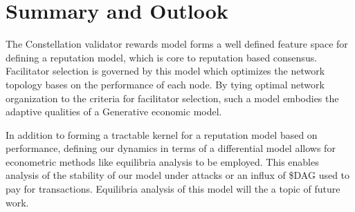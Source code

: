 \documentclass{article}
\begin{document}
\section{Summary and Outlook}
The Constellation validator rewards model forms a well defined feature space for defining a reputation model, which is core to reputation based consensus. Facilitator selection is governed by this model which optimizes the network topology bases on the performance of each node. By tying optimal network organization to the criteria for facilitator selection, such a model embodies the adaptive qualities of a Generative economic model.

In addition to forming a tractable kernel for a reputation model based on performance, defining our dynamics in terms of a differential model allows for econometric methods like equilibria analysis to be employed. This enables analysis of the stability of our model under attacks or an influx of \$DAG used to pay for transactions. Equilibria analysis of this model will the a topic of future work.


\end{document}
